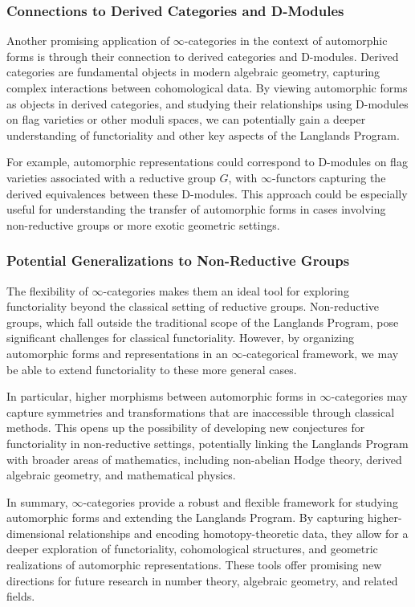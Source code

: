 \documentclass{article}
\theoremstyle{remark}
\begin{document}
\subsubsection{Connections to Derived Categories and D-Modules}

Another promising application of $\infty$-categories in the context of automorphic forms is through their connection to derived categories and D-modules. Derived categories are fundamental objects in modern algebraic geometry, capturing complex interactions between cohomological data. By viewing automorphic forms as objects in derived categories, and studying their relationships using D-modules on flag varieties or other moduli spaces, we can potentially gain a deeper understanding of functoriality and other key aspects of the Langlands Program.

For example, automorphic representations could correspond to D-modules on flag varieties associated with a reductive group $G$, with $\infty$-functors capturing the derived equivalences between these D-modules. This approach could be especially useful for understanding the transfer of automorphic forms in cases involving non-reductive groups or more exotic geometric settings.

\subsubsection{Potential Generalizations to Non-Reductive Groups}

The flexibility of $\infty$-categories makes them an ideal tool for exploring functoriality beyond the classical setting of reductive groups. Non-reductive groups, which fall outside the traditional scope of the Langlands Program, pose significant challenges for classical functoriality. However, by organizing automorphic forms and representations in an $\infty$-categorical framework, we may be able to extend functoriality to these more general cases.

In particular, higher morphisms between automorphic forms in $\infty$-categories may capture symmetries and transformations that are inaccessible through classical methods. This opens up the possibility of developing new conjectures for functoriality in non-reductive settings, potentially linking the Langlands Program with broader areas of mathematics, including non-abelian Hodge theory, derived algebraic geometry, and mathematical physics.

In summary, $\infty$-categories provide a robust and flexible framework for studying automorphic forms and extending the Langlands Program. By capturing higher-dimensional relationships and encoding homotopy-theoretic data, they allow for a deeper exploration of functoriality, cohomological structures, and geometric realizations of automorphic representations. These tools offer promising new directions for future research in number theory, algebraic geometry, and related fields.
\end{document}
